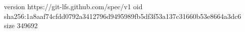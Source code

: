 version https://git-lfs.github.com/spec/v1
oid sha256:1a8aaf74cfdd0792a3412796d9495989fb5df3f53a137c31660b53e8664a3dc6
size 349692
